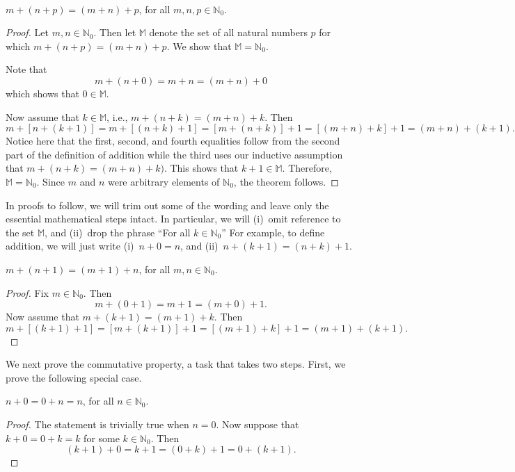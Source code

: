 \begin{theorem}{}\\
$m+(n+p) = (m+n)+p$, for all $m,n,p\in \mathbb{N}_0$.
\end{theorem}

\begin{proof}
Let $m,n\in \mathbb{N}_0$. Then let 
$\mathbb{M}$ denote the set of all natural numbers $p$ for
which $m+(n+p)=(m+n)+p$.  We show that $\mathbb{M}=\mathbb{N}_0$.

Note that 
\[
m+(n+0) = m+n = (m+n)+0 
\]
which shows that $0\in \mathbb{M}$.

Now assume that $k\in \mathbb{M}$, i.e., $m+(n+k) = (m+n)+k$.
Then
\[
m+[n+(k+1)]=m+[(n+k)+1]=[m+(n+k)]+1= [(m+n)+k]+1=(m+n)+(k+1). 
\]
Notice here that the first, second, and fourth equalities follow from
the second part of the definition of addition while the third uses our
inductive assumption that $m+(n+k)=(m+n)+k)$. This shows that $k+1\in
\mathbb{M}$.  Therefore, $\mathbb{M}= \mathbb{N}_0$.  Since $m$ and
$n$ were arbitrary elements of $\mathbb{N}_0$, the theorem follows.
\end{proof}

In proofs to follow, we will trim out some of the wording
and leave only the essential mathematical steps intact.
In particular, we will (i)~omit reference to the set $\mathbb{M}$,
and (ii)~drop the phrase ``For all $k\in\mathbb{N}_0$'' 
For example, to define addition, we will just
write (i)~$n+0=n$, and (ii)~$n+(k+1) = (n+k)+1$.

\begin{lemma}
$m+(n+1) = (m+1)+n$, for all $m,n\in\mathbb{N}_0$.
\end{lemma}
\begin{proof}
Fix $m\in \mathbb{N}_0$.  Then
\[
m+(0+1)=m+1= (m+0)+1.
\]
Now assume that $m+(k+1)=(m+1)+k$.
Then
\[
m+[(k+1)+1]=[m+(k+1)]+1=[(m+1)+k]+1=(m+1)+(k+1).
\]
\end{proof}

We next prove the commutative property, a task that takes
two steps. First, we prove the following special case.

\begin{lemma}
$n+0 = 0+n=n$, for all $n\in \mathbb{N}_0$.
\end{lemma}

\begin{proof}
The statement is trivially true when $n= 0$.
Now suppose that $k+0=0+k=k$ for some $k\in \mathbb{N}_0$.
Then
\[
(k+1) +0 = k+1 = (0+k)+1= 0+(k+1).
\]
\end{proof}

